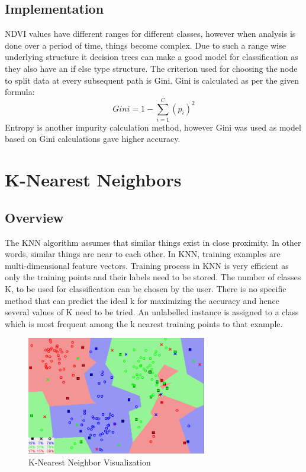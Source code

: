 \documentclass[12pt, a4paper]{report}
\begin{document}
\subsection{Implementation}
NDVI values have different ranges for different classes, however when analysis is done over a period of time, things become complex. Due to such a range wise  underlying structure it decision trees can make a good model for classification as they also have an if else type structure. The criterion used for choosing the node to split data at every subsequent path is Gini. Gini is calculated as per the given formula:
\begin{displaymath}
Gini=1-\sum_{i=1}^{C}(p_i)^2
\end{displaymath}
Entropy is another impurity calculation method, however Gini was used as model based on Gini calculations gave higher accuracy.
\section{K-Nearest Neighbors}
\subsection{Overview}
The KNN algorithm assumes that similar things exist in close proximity. In other words, similar things are near to each other. In KNN, training examples are multi-dimensional feature vectors. Training process in KNN is very efficient as only the training points and their labels need to be stored. The number of classes K, to be used for classification can be chosen by the user. There is no specific method that can predict the ideal k for maximizing the accuracy and hence several values of K need to be tried. An unlabelled instance is assigned to a class which is most frequent among the k nearest training points to that example.
\begin{figure}[h]
\centering
\includegraphics[width=0.7\textwidth]{knnone.png}
\caption{K-Nearest Neighbor Visualization}
\end{figure}
\end{document}
